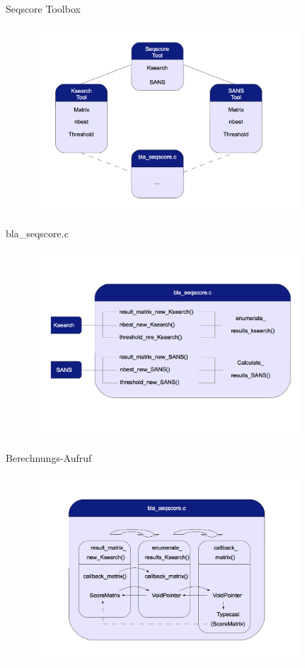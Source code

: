 \documentclass[xcolor=dvipsnames, aspectratio=1610]{beamer}
\begin{document}
\begin{frame}{Seqscore Toolbox}
  \begin{figure}[h]
    \includegraphics[height=7cm]{img/dia1.png}
  \end{figure}
\end{frame}

\begin{frame}{bla\_seqscore.c}
  \begin{figure}[h]
    \includegraphics[height=7cm]{img/dia2.png}
  \end{figure}
\end{frame}

\begin{frame}{Berechnungs-Aufruf}
  \begin{figure}[h]
    \includegraphics[height=7cm]{img/dia3.png}
  \end{figure}
\end{frame}
\end{document}
